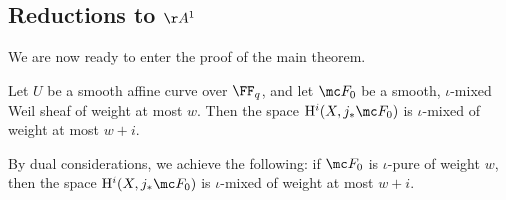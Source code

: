 \documentclass[../notes.tex]{subfiles}
\begin{document}
\subsection{Reductions to \texorpdfstring{$\AA^1$}{ A1}}
We are now ready to enter the proof of the main theorem.
\begin{theorem} \label{thm:weil-ii-curve}
	Let $U$ be a smooth affine curve over $\FF_q$, and let $\mc F_0$ be a smooth, $\iota$-mixed Weil sheaf of weight at most $w$. Then the space $\mathrm H^i(X,j_*\mc F_0)$ is $\iota$-mixed of weight at most $w+i$.
\end{theorem}
\begin{remark}
	By dual considerations, we achieve the following: if $\mc F_0$ is $\iota$-pure of weight $w$, then the space $\mathrm H^i(X,j_*\mc F_0)$ is $\iota$-mixed of weight at most $w+i$.
\end{remark}
\end{document}

